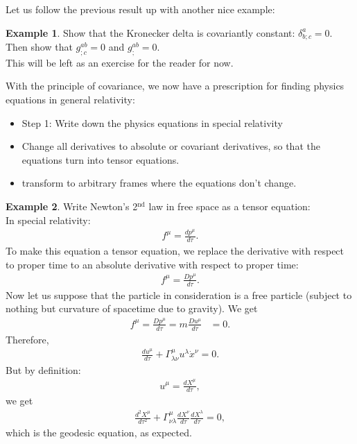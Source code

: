 \documentclass{article}
\theoremstyle{definition}
\newtheorem{exmp}{Example}[section]
\begin{document}
Let us follow the previous result up with another nice example:
\begin{exmp}
	Show that the Kronecker delta is covariantly constant: $\delta^a_{b;c} = 0$. Then show that $g^{ab}_{;c} = 0$ and $g^{ab}_{;} = 0$.\\
	
	This will be left as an exercise for the reader for now. 
\end{exmp}

With the principle of covariance, we now have a prescription for finding physics equations in general relativity: 
\begin{itemize}
	\item Step 1: Write down the physics equations in special relativity
	\item Change all derivatives to absolute or covariant derivatives, so that the equations turn into tensor equations.
	\item transform to arbitrary frames where the equations don't change.
\end{itemize}

\begin{exmp}
	Write Newton's 2$^{\text{nd}}$ law in free space as a tensor equation:\\
	
	In special relativity: 
	\begin{align*}
	f^\mu = \frac{dp^\mu}{d\tau}.
	\end{align*}
	To make this equation a tensor equation, we replace the derivative with respect to proper time to an absolute derivative with respect to proper time:
	\begin{align*}
	f^\mu = \frac{Dp^\mu}{d\tau}.
	\end{align*}
	Now let us suppose that the particle in consideration is a free particle (subject to nothing but curvature of spacetime due to gravity). We get
	\begin{align*}
	f^\mu = \frac{Dp^\mu}{d\tau} = m\frac{Du^\mu}{d\tau} &= 0.
	\end{align*}
	Therefore,
	\begin{align*}
	\frac{du^\mu}{d\tau} + \Gamma^\mu_{\lambda\nu}u^\lambda\dot{x}^\nu = 0.
	\end{align*}
	But by definition:
	\begin{align*}
	u^\mu = \frac{dX^\mu}{d\tau},
	\end{align*}
	we get
	\begin{align*}
	\frac{d^2X^\mu}{d\tau^2} + \Gamma^\mu_{\nu\lambda}\frac{dX^\nu}{d\tau}\frac{dX^\lambda}{d\tau} = 0,
	\end{align*}
	which is the geodesic equation, as expected. 
\end{exmp}
\end{document}
